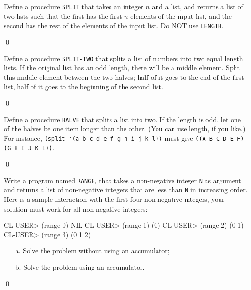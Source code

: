 \documentclass[a4paper,11pt]{article}
\begin{document}
\begin{uexercise}
Define a procedure \Verb+SPLIT+ that takes an integer $n$ and a list, and returns a list of two lists such that the first has the first $n$ elements of the input list, and the second has the rest of the elements of the input list. Do NOT use \Verb+LENGTH+.

\qed
\end{uexercise}

\begin{uexercise}
Define a procedure \Verb+SPLIT-TWO+ that splits a list of numbers into two equal length lists. If the original list has an odd length, there will be a middle element. Split this middle element between the two halves; half of it goes to the end of the first list, half of it goes to the beginning of the second list.

\qed
\end{uexercise}

\begin{uexercise}
\label{halve}

Define a procedure \Verb+HALVE+ that splits a list into two. If the
length is odd, let one of the halves be one item longer than the
other. (You can use length, if you like.)  For instance, \Verb+(split '(a b c d e f g h i j k l))+
must give \Verb+((A B C D E F) (G H I J K L))+.

\qed
\end{uexercise}

\begin{uexercise}[*]
Write a program named \Verb+RANGE+, that takes a non-negative integer
\Verb+N+ as argument and returns a list of non-negative integers that
are less than \Verb+N+ in increasing order.  Here is a sample
interaction with the first four non-negative integers, your solution
must work for all non-negative integers: 

\begin{lispcode}
CL-USER> (range 0)
NIL
CL-USER> (range 1)
(0)
CL-USER> (range 2)
(0 1)
CL-USER> (range 3)
(0 1 2)
\end{lispcode}

\begin{itemize}
\item[a.] Solve the problem without using an accumulator;
\item[b.] Solve the problem using an accumulator.
\end{itemize}

\qed
\end{uexercise}
\end{document}
